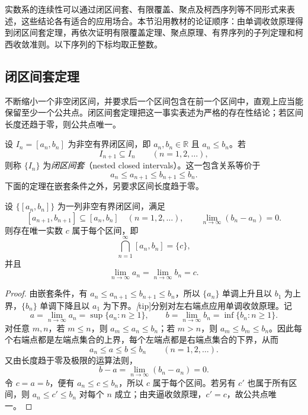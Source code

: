 \documentclass[UTF8,12pt,a4paper,fontset=fandol]{ctexbook}
\begin{document}
实数系的连续性可以通过闭区间套、有限覆盖、聚点及柯西序列等不同形式来表述，这些结论各有适合的应用场合。本节沿用教材的论证顺序：由单调收敛原理得到闭区间套定理，再依次证明有限覆盖定理、聚点原理、有界序列的子列定理和柯西收敛准则。以下序列的下标均取正整数。

\subsection{闭区间套定理}
\label{subsec:nested-interval-theorem}

不断缩小一个非空闭区间，并要求后一个区间包含在前一个区间中，直观上应当能保留至少一个公共点。闭区间套定理把这一事实表述为严格的存在性结论；若区间长度还趋于零，则公共点唯一。

\begin{definition}
\label{def:nested-closed-intervals}
设 $I_n=[a_n,b_n]$ 为非空有界闭区间，即 $a_n,b_n\in\mathbb{R}$ 且 $a_n\leq b_n$。若
\[
    I_{n+1}\subseteq I_n\qquad(n=1,2,\ldots),
\]
则称 $\{I_n\}$ 为\emph{闭区间套}（nested closed intervals）。这一包含关系等价于
\[
    a_n\leq a_{n+1}\leq b_{n+1}\leq b_n.
\]
下面的定理在嵌套条件之外，另要求区间长度趋于零。
\end{definition}

\begin{theorem}[闭区间套定理]
\label{thm:nested-closed-intervals}
设 $\{[a_n,b_n]\}$ 为一列非空有界闭区间，满足
\[
    [a_{n+1},b_{n+1}]\subseteq[a_n,b_n]\quad(n=1,2,\ldots),
    \qquad
    \lim_{n\to\infty}(b_n-a_n)=0.
\]
则存在唯一实数 $c$ 属于每个区间，即
\[
    \bigcap_{n=1}^{\infty}[a_n,b_n]=\{c\},
\]
并且
\[
    \lim_{n\to\infty}a_n=\lim_{n\to\infty}b_n=c.
\]
\end{theorem}

\begin{proof}
由嵌套条件，有 $a_n\leq a_{n+1}\leq b_{n+1}\leq b_n$，所以 $\{a_n\}$ 单调上升且以 $b_1$ 为上界，$\{b_n\}$ 单调下降且以 $a_1$ 为下界。\emph[tip]{分别对左右端点应用单调收敛原理。}记
\[
    a=\lim_{n\to\infty}a_n=\sup\{a_n:n\geq1\},
    \qquad
    b=\lim_{n\to\infty}b_n=\inf\{b_n:n\geq1\}.
\]
对任意 $m,n$，若 $m\leq n$，则 $a_m\leq a_n\leq b_n$；若 $m>n$，则 $a_m\leq b_m\leq b_n$。因此每个右端点都是左端点集合的上界，每个左端点都是右端点集合的下界，从而
\[
    a_n\leq a\leq b\leq b_n\qquad(n=1,2,\ldots).
\]
又由长度趋于零及极限的运算法则，
\[
    b-a=\lim_{n\to\infty}(b_n-a_n)=0.
\]
令 $c=a=b$，便有 $a_n\leq c\leq b_n$，所以 $c$ 属于每个区间。若另有 $c'$ 也属于所有区间，则 $a_n\leq c'\leq b_n$ 对每个 $n$ 成立；由夹逼收敛原理，$c'=c$，故公共点唯一。
\end{proof}
\end{document}
